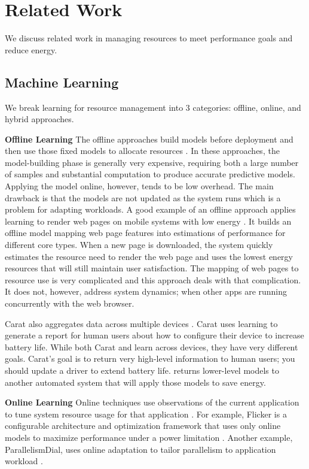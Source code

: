 \section{Related Work}

We discuss related work in managing resources to meet performance
goals and reduce energy.  

\subsection{Machine Learning}
We break learning for resource management into 3 categories: offline,
online, and hybrid approaches.

\noindent \textbf{Offline Learning}
The offline approaches build models before deployment and then use
those fixed models to allocate resources
\cite{Yi2003,LeeBrooks2006,CPR,ChenJohn2011,petabricksStatic}.  In
these approaches, the model-building phase is generally very
expensive, requiring both a large number of samples and substantial
computation to produce accurate predictive models.  Applying the model
online, however, tends to be low overhead.  The main drawback is that
the models are not updated as the system runs which is a problem for
adapting workloads. A good example of an offline approach applies
learning to render web pages on mobile systems with low energy
\cite{reddiHPCA2013}. It builds an offline model mapping web page
features into estimations of performance for different core types.
When a new page is downloaded, the system quickly estimates the
resource need to render the web page and uses the lowest energy
resources that will still maintain user satisfaction.  The mapping of
web pages to resource use is very complicated and this approach deals
with that complication.  It does not, however, address system
dynamics; \eg{} when other apps are running concurrently with the web
browser.

Carat also aggregates data across multiple devices \cite{carat}.
Carat uses learning to generate a report for human users about how to
configure their device to increase battery life.  While both Carat and
\SYSTEM{} learn across devices, they have very different goals.
Carat's goal is to return very high-level information to human users;
\eg{} you should update a driver to extend battery life.  \SYSTEM{}
returns lower-level models to another automated system that will apply
those models to save energy.

\noindent \textbf{Online Learning}
Online techniques use observations of the current application to tune
system resource usage for that application
\cite{Li2006,Flicker,ParallelismDial,Ponamarev,petabricksDynamic,LeeBrooks}.
For example, Flicker is a configurable architecture and optimization
framework that uses only online models to maximize performance under a
power limitation \cite{Flicker}.  Another example, ParallelismDial,
uses online adaptation to tailor parallelism to application workload
\cite{ParallelismDial}.



